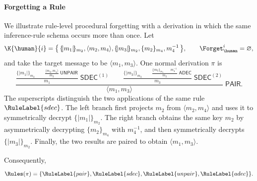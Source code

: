 \paragraph{Forgetting a Rule}
We illustrate rule-level procedural forgetting with a derivation in which the same inference-rule schema occurs more than once. Let
\[
    \K{\human}{i}
    = \bigl\{\, \{\!|m_1|\!\}_{m_2}, \langle m_2,m_4\rangle, \{\!|m_3|\!\}_{m_2}, \{m_2\}_{m_4}, m_4^{-1} \,\bigr\},
    \qquad
    \Forget_{\human}^{i}=\varnothing,
\]
and take the target message to be $\langle m_1,m_3\rangle$. One normal derivation $\pi$ is
\[
\frac{
    \displaystyle
    \frac{
        \{\!|m_1|\!\}_{m_2}
        \qquad
        \displaystyle\frac{\langle m_2,m_4\rangle}{m_2}\;\mathsf{UNPAIR}
    }{m_1}\;\mathsf{SDEC}^{(1)}
    \qquad
    \displaystyle
    \frac{
        \{\!|m_3|\!\}_{m_2}
        \qquad
        \displaystyle\frac{\{m_2\}_{m_4}\qquad m_4^{-1}}{m_2}\;\mathsf{ADEC}
    }{m_3}\;\mathsf{SDEC}^{(2)}
}{\langle m_1,m_3\rangle}\;\mathsf{PAIR}.
\]
The superscripts distinguish the two applications of the same rule
$\RuleLabel{sdec}$. The left branch first projects $m_2$ from $\langle m_2,m_4\rangle$ and uses it to symmetrically decrypt $\{\!|m_1|\!\}_{m_2}$. The right branch obtains the same key $m_2$ by asymmetrically decrypting $\{m_2\}_{m_4}$ with $m_4^{-1}$, and then symmetrically decrypts $\{\!|m_3|\!\}_{m_2}$. Finally, the two results are paired to obtain $\langle m_1,m_3\rangle$.

Consequently,
\[
    \Rules(\pi)=
    \{\RuleLabel{pair},\RuleLabel{sdec},
      \RuleLabel{unpair},\RuleLabel{adec}\}.
\]

